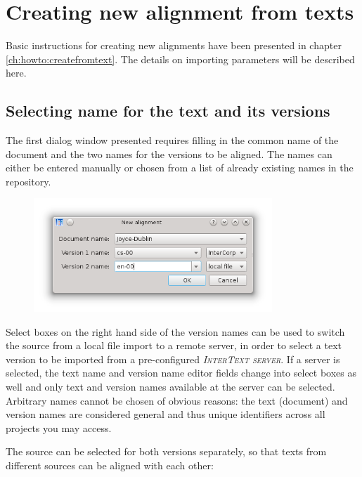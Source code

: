 \documentclass[a4paper,10pt,oneside]{book}
\newcommand{\ITserver}{\textit{\textsc{InterText server}}\xspace}
\begin{document}
\section{Creating new alignment from texts}\label{ch:detail:managing_local:new}

Basic instructions for creating new alignments have been presented in chapter \ref{ch:howto:createfromtext}. The details on importing parameters will be described here.

\subsection{Selecting name for the text and its versions}\label{ch:detail:managing_local:new:names}

The first dialog window presented requires filling in the common name of the document and the two names for the versions to be aligned. The names can either be entered manually or chosen from a list of already existing names in the repository.

\begin{figure}[htbf]
 \includegraphics[width=0.8\textwidth]{screenshots/new_alignment.png}
\end{figure}

Select boxes on the right hand side of the version names can be used to switch the source from a local file import to a remote server, in order to select a text version to be imported from a pre-configured \ITserver. If a server is selected, the text name and version name editor fields change into select boxes as well and only text and version names available at the server can be selected. Arbitrary names cannot be chosen of obvious reasons: the text (document) and version names are considered general and thus unique identifiers across all projects you may access.

The source can be selected for both versions separately, so that texts from different sources can be aligned with each other:
\end{document}

